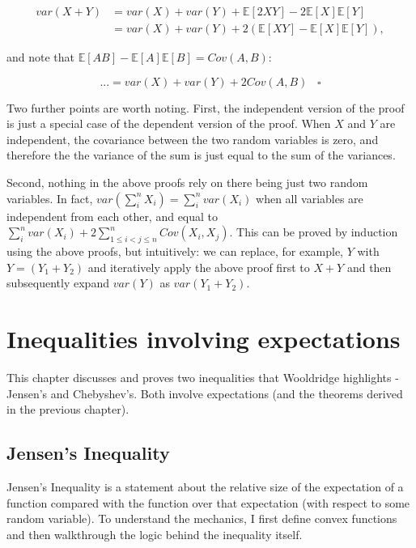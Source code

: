 \documentclass[
]{book}
\begin{document}
\begin{align}
    var(X + Y) &= var(X) + var(Y) + \mathbb{E}[2XY] - 2\mathbb{E}[X]\mathbb{E}[Y]\\
    & = var(X) + var(Y) + 2(\mathbb{E}[XY] - \mathbb{E}[X]\mathbb{E}[Y]),
\end{align}

and note that \(\mathbb{E}[AB]-\mathbb{E}[A]\mathbb{E}[B] = Cov(A,B)\):

\begin{equation}
... = var(X) + var(Y) + 2Cov(A,B) \; \; \; \square
\end{equation}

Two further points are worth noting. First, the independent version of the proof is just a special case of the dependent version of the proof. When \(X\) and \(Y\) are independent, the covariance between the two random variables is zero, and therefore the the variance of the sum is just equal to the sum of the variances.

Second, nothing in the above proofs rely on there being just two random variables. In fact, \(var(\sum^n_i X_i) = \sum^n_ivar(X_i)\) when all variables are independent from each other, and equal to \(\sum^n_ivar(X_i) + 2\sum^n_{1 \leq i < j \leq n}Cov(X_i,X_j).\) This can be proved by induction using the above proofs, but intuitively: we can replace, for example, \(Y\) with \(Y = (Y_1 + Y_2)\) and iteratively apply the above proof first to \(X+Y\) and then subsequently expand \(var(Y)\) as \(var(Y_1+Y_2)\).

\hypertarget{exp_ineq}{%
\chapter{Inequalities involving expectations}\label{exp_ineq}}

This chapter discusses and proves two inequalities that Wooldridge highlights - Jensen's and Chebyshev's. Both involve expectations (and the theorems derived in the previous chapter).

\hypertarget{jensens-inequality}{%
\section{Jensen's Inequality}\label{jensens-inequality}}

Jensen's Inequality is a statement about the relative size of the expectation of a function compared with the function over that expectation (with respect to some random variable). To understand the mechanics, I first define convex functions and then walkthrough the logic behind the inequality itself.
\end{document}
